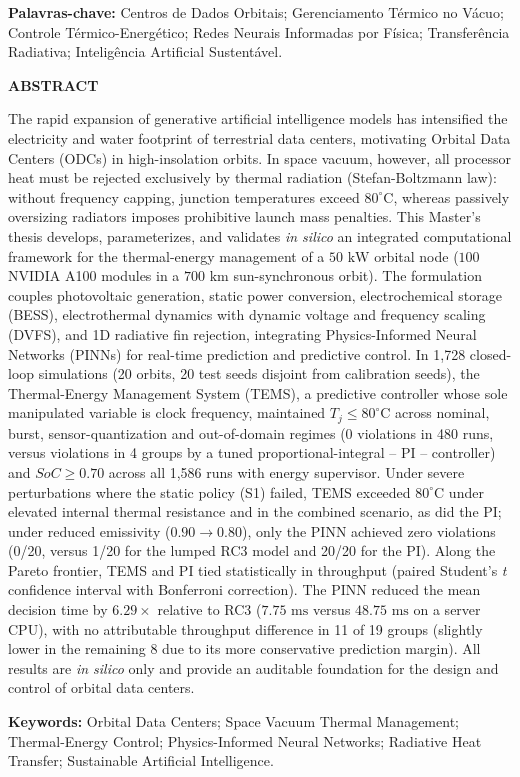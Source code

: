 \vspace{0.5cm}
\noindent\textbf{Palavras-chave:} Centros de Dados Orbitais; Gerenciamento Térmico no Vácuo; Controle Térmico-Energético; Redes Neurais Informadas por Física; Transferência Radiativa; Inteligência Artificial Sustentável.

\newpage
\begin{center}
    \textbf{ABSTRACT}
\end{center}
\vspace{0.3cm}

\noindent The rapid expansion of generative artificial intelligence models has intensified the electricity and water footprint of terrestrial data centers, motivating Orbital Data Centers (ODCs) in high-insolation orbits. In space vacuum, however, all processor heat must be rejected exclusively by thermal radiation (Stefan-Boltzmann law): without frequency capping, junction temperatures exceed $80^\circ\text{C}$, whereas passively oversizing radiators imposes prohibitive launch mass penalties. This Master's thesis develops, parameterizes, and validates \textit{in silico} an integrated computational framework for the thermal-energy management of a $50\text{ kW}$ orbital node ($100$ NVIDIA A100 modules in a $700\text{ km}$ sun-synchronous orbit). The formulation couples photovoltaic generation, static power conversion, electrochemical storage (BESS), electrothermal dynamics with dynamic voltage and frequency scaling (DVFS), and 1D radiative fin rejection, integrating Physics-Informed Neural Networks (PINNs) for real-time prediction and predictive control. In 1,728 closed-loop simulations (20 orbits, 20 test seeds disjoint from calibration seeds), the Thermal-Energy Management System (TEMS), a predictive controller whose sole manipulated variable is clock frequency, maintained $T_j \le 80^\circ\text{C}$ across nominal, burst, sensor-quantization and out-of-domain regimes (0 violations in 480 runs, versus violations in 4 groups by a tuned proportional-integral -- PI -- controller) and $SoC \ge 0.70$ across all 1,586 runs with energy supervisor. Under severe perturbations where the static policy (S1) failed, TEMS exceeded $80^\circ\text{C}$ under elevated internal thermal resistance and in the combined scenario, as did the PI; under reduced emissivity ($0.90 \to 0.80$), only the PINN achieved zero violations (0/20, versus 1/20 for the lumped RC3 model and 20/20 for the PI). Along the Pareto frontier, TEMS and PI tied statistically in throughput (paired Student's \textit{t} confidence interval with Bonferroni correction). The PINN reduced the mean decision time by $6.29\times$ relative to RC3 ($7.75\text{ ms}$ versus $48.75\text{ ms}$ on a server CPU), with no attributable throughput difference in 11 of 19 groups (slightly lower in the remaining 8 due to its more conservative prediction margin). All results are \textit{in silico} only and provide an auditable foundation for the design and control of orbital data centers.

\vspace{0.5cm}
\noindent\textbf{Keywords:} Orbital Data Centers; Space Vacuum Thermal Management; Thermal-Energy Control; Physics-Informed Neural Networks; Radiative Heat Transfer; Sustainable Artificial Intelligence.
